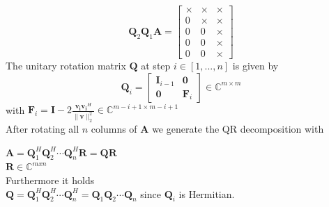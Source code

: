 \documentclass[english]{latex4ei/latex4ei_sheet}
\begin{document}
\begin{sectionbox}
$$\mathbf{Q}_2\mathbf{Q}_1 \mathbf{A} = \begin{bmatrix}
	\times & \times & \times \\
	0 & \times & \times \\
	0 & 0 & \times \\
	0 & 0 & \times \\
	0 & 0 & \times
\end{bmatrix}$$
The unitary rotation matrix $\mathbf{Q}$ at step $i\in[1,...,n]$ is given by
$$\mathbf{Q}_i = \begin{bmatrix}
\mathbf{I}_{i-1} & \mathbf{0}\\
\mathbf{0} & \mathbf{F}_i
\end{bmatrix}\in\mathbb{C}^{m\times m}$$
with $\mathbf{F}_i = \mathbf{I}-2\frac{\mathbf{v_i}\mathbf{v_i}^H}{\parallel \mathbf{v}\parallel_2^2} \in \mathbb{C}^{m-i+1 \times m-i+1}$\\

After rotating all $n$ columns of $\mathbf{A}$ we generate the QR decomposition with

$\mathbf{A} = \mathbf{Q}_1^H\mathbf{Q}_2^H\cdots\mathbf{Q}_n^H \mathbf{R} = \mathbf{Q}\mathbf{R}$\\

$\mathbf{R} \in \mathbb{C}^{mxn}$\\
Furthermore it holds\\
$\mathbf{Q} = \mathbf{Q}_1^H\mathbf{Q}_2^H\cdots\mathbf{Q}_n^H = \mathbf{Q}_1\mathbf{Q}_2\cdots\mathbf{Q}_n$ 
since $\mathbf{Q}_i$ is Hermitian.

\end{sectionbox}
\end{document}
